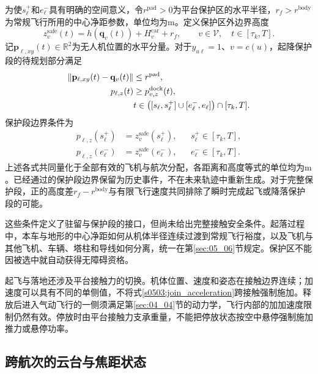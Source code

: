 为使$s_\ell^+$和$e_\ell^-$具有明确的空间意义，令$r^{\mathrm{pad}}>0$为平台保护区的水平半径，$r_f>r^{\mathrm{body}}$为常规飞行所用的中心净距参数，单位均为$\mathrm m$。定义保护区外边界高度
\begin{equation}
 z_v^{\mathrm{safe}}(t)
 =h(\mathbf q_v(t))+H_v^{\mathrm{car}}+r_f,
 \qquad v\in\mathcal V,\quad t\in[\tau_k,T].
 \label{s0504:protection_height}
\end{equation}
记$\mathbf p_{\ell,xy}(t)\in\mathbb R^2$为无人机位置的水平分量。对于$y_{u\ell}=1$、$v=c(u)$，起降保护段的待规划部分满足
\begin{align}
 \|\mathbf p_{\ell,xy}(t)-\mathbf q_v(t)\|
 &\le r^{\mathrm{pad}},
 \label{s0504:protection_horizontal}\\
 p_{\ell,z}(t)&\ge p_{v,z}^{\mathrm{dock}}(t),
 \label{s0504:protection_vertical}\\
 &t\in\bigl([s_\ell,s_\ell^+]\cup[e_\ell^-,e_\ell]\bigr)
       \cap[\tau_k,T].\notag
\end{align}
保护段边界条件为
\begin{align}
 p_{\ell,z}(s_\ell^+)&=z_v^{\mathrm{safe}}(s_\ell^+),
 &&s_\ell^+\in[\tau_k,T],
 \label{s0504:launch_protection_endpoint}\\
 p_{\ell,z}(e_\ell^-)&=z_v^{\mathrm{safe}}(e_\ell^-),
 &&e_\ell^-\in[\tau_k,T].
 \label{s0504:recovery_protection_endpoint}
\end{align}
上述各式共同量化于全部有效的飞机与航次分配，各距离和高度等式的单位均为$\mathrm m$。已经通过的保护段边界保留为历史事件，不在未来轨迹中重新生成。对于完整保护段，正的高度差$r_f-r^{\mathrm{body}}$与有限飞行速度共同排除了瞬时完成起飞或降落保护段的可能。

这些条件定义了驻留与保护段的接口，但尚未给出完整接触安全条件。起落过程中，本车与地形的中心净距如何从机体半径连续过渡到常规飞行裕度，以及飞机与其他飞机、车辆、塔柱和导线如何分离，统一在第\ref{sec:05_06}节规定。保护区不能因被选中就自动获得无障碍资格。

起飞与落地还涉及平台接触力的切换。机体位置、速度和姿态在接触边界连续；加速度可以具有不同的单侧值，不将式\eqref{s0503:join_acceleration}跨接触强制施加。释放后进入气动飞行的一侧须满足第\ref{sec:04_04}节的动力学，飞行内部的加加速度限制仍然有效。停放时由平台接触力支承重量，不能把停放状态按空中悬停强制施加推力或悬停功率。

\subsection{跨航次的云台与焦距状态}

